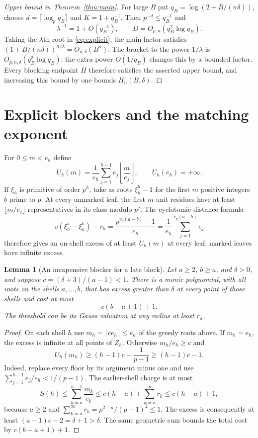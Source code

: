 \documentclass[11pt]{article}
\newtheorem{lemma}[theorem]{Lemma}
\theoremstyle{remark}\newtheorem{remark}[theorem]{Remark}
\begin{document}
\begin{proof}[Upper bound in Theorem~\ref{thm:main}]
For large $B$ put
$q_B=\log(2+B/(n\delta))$, choose
$d=\lceil\log_p q_B\rceil$ and $K=1+q_B^{-1}$.
Then $p^{-d}\le q_B^{-1}$ and
\[
 \lambda^{-1}=1+O(q_B^{-1}),\qquad
 D=O_{p,n}(q_B^2\log q_B).
\]
Taking the $\lambda$th root in \eqref{eq:explicit}, the main factor satisfies
$(1+B/(n\delta))^{n/\lambda}=O_{n,\delta}(B^n)$.
The bracket to the power $1/\lambda$ is
$O_{p,n,\delta}(q_B^2\log q_B)$: the extra power
$O(1/q_B)$ changes this by a bounded factor.
Every blocking endpoint $H$ therefore satisfies the asserted upper bound, and
increasing this bound by one bounds $H_n(B,\delta)$.
\end{proof}

\section{Explicit blockers and the matching exponent}
For $0\le m<e_h$ define
\[
 U_h(m)=\frac1{e_h}\sum_{j=1}^{h-1}e_j\left\lfloor\frac m{e_j}\right\rfloor,
 \qquad U_h(e_h)=+\infty.
\]
If $\xi_h$ is primitive of order $p^h$, take as roots $\xi_h^b-1$ for the first $m$
positive integers $b$ prime to $p$. At every unmarked leaf, the first $m$ unit residues
have at least $\lfloor m/e_j\rfloor$ representatives in its class modulo $p^j$.
The cyclotomic distance formula
\[
 v(\xi_h^a-\xi_h^b)-r_h
 =\frac{p^{v_p(a-b)}-1}{e_h}
 =\frac1{e_h}\sum_{j=1}^{v_p(a-b)}e_j
\]
therefore gives an on-shell excess of at least $U_h(m)$ at every leaf; marked leaves
have infinite excess.

\begin{lemma}[An inexpensive blocker for a late block]\label{lem:block}
Let $a\ge2$, $b\ge a$, and $\delta>0$, and suppose
$c=(\delta+3)/(a-1)<1$. There is a monic polynomial, with all roots on the shells
$a,\ldots,b$, that has excess greater than $\delta$ at every point of those shells
and cost at most
\[
 c(b-a+1)+1.
\]
The threshold can be its Gauss valuation at any radius at least $r_a$.
\end{lemma}
\begin{proof}
On each shell $h$ use $m_h=\lceil c e_h\rceil\le e_h$ of the greedy roots above.
If $m_h=e_h$, the excess is infinite at all points of $Z_h$.
Otherwise $m_h/e_h\ge c$ and
\[
 U_h(m_h)\ge (h-1)c-\frac1{p-1}\ge(h-1)c-1.
\]
Indeed, replace every floor by its argument minus one and use
$\sum_{j=1}^{h-1}e_j/e_h<1/(p-1)$.
The earlier-shell charge is at most
\[
 S(h)\le\sum_{k=a}^{h-1}\frac{m_k}{e_k}
 \le c(h-a)+\sum_{k=a}^{\infty}r_k
 \le c(h-a)+1,
\]
because $a\ge2$ and
$\sum_{k=a}^{\infty}r_k=p^{2-a}/(p-1)^2\le1$.
The excess is consequently at least
$(a-1)c-2=\delta+1>\delta$.
The same geometric sum bounds the total cost by $c(b-a+1)+1$.
\end{proof}
\end{document}
